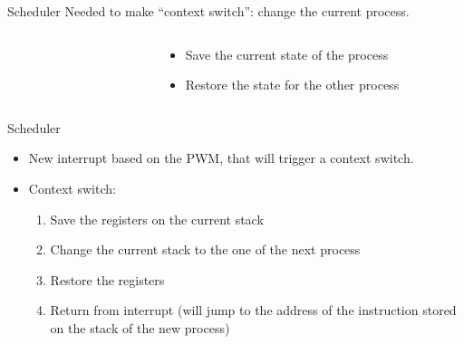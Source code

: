 \documentclass{beamer}
\begin{document}
    \begin{frame}{Scheduler}
      Needed to make ``context switch'': change the current process.

      \begin{columns}
        \begin{column}{0.4\textwidth}
          \begin{figure}
            \centering
          \end{figure}
        \end{column}
        \begin{column}{0.6\textwidth}
          \begin{itemize}
            \item Save the current state of the process
            \item Restore the state for the other process
          \end{itemize}

        \end{column}
      \end{columns}

    \end{frame}

    \begin{frame}{Scheduler}
      \begin{itemize}
        \item New interrupt based on the PWM, that will trigger a context switch.
        \item Context switch:
        \begin{enumerate}
           \item Save the registers on the current stack
           \item Change the current stack to the one of the next process
           \item Restore the registers
           \item Return from interrupt (will jump to the address of the
             instruction stored on the stack of the new process)
        \end{enumerate}
      \end{itemize}
    \end{frame}
\end{document}
